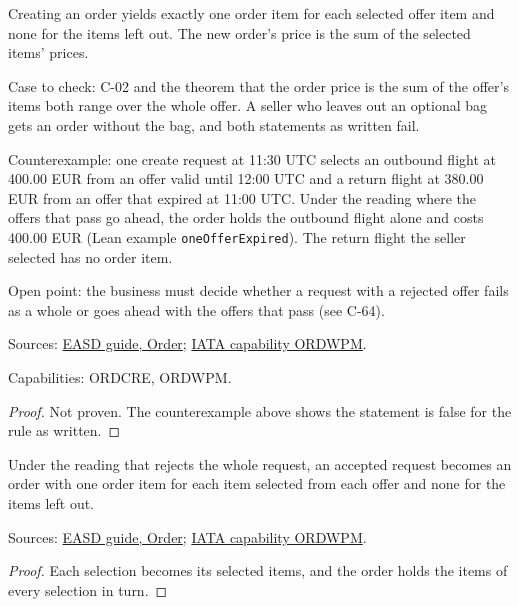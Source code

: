 \begin{theorem}
  \label{thm:order-creation-items-match-selection}
  Creating an order yields exactly one order item for each selected offer
  item and none for the items left out. The new order's price is the sum of
  the selected items' prices.

  Case to check: C-02 and the theorem that the order price is the sum of the
  offer's items both range over the whole offer. A seller who leaves out an
  optional bag gets an order without the bag, and both statements as written
  fail.

  Counterexample: one create request at 11:30 UTC selects an outbound flight
  at 400.00 EUR from an offer valid until 12:00 UTC and a return flight at
  380.00 EUR from an offer that expired at 11:00 UTC.  Under the reading where
  the offers that pass go ahead, the order holds the outbound flight alone
  and costs 400.00 EUR (Lean example \texttt{oneOfferExpired}).
  The return flight the seller selected has no order item.

  Open point: the business must decide whether a request with a rejected
  offer fails as a whole or goes ahead with the offers that pass (see C-64).

  Sources: \href{https://standards.atlassian.net/wiki/spaces/EASD/pages/574849062/Order}{EASD guide, Order};
  \href{https://retailing.iata.org/armi/docs/ORDWPM/}{IATA capability ORDWPM}.

  Capabilities: ORDCRE, ORDWPM.
\end{theorem}
\begin{proof}
  Not proven.  The counterexample above shows the statement is false for the
  rule as written.
\end{proof}

\begin{theorem}
  \label{thm:order-creation-items-match-selection-of-whole}
  Under the reading that rejects the whole request, an accepted request
  becomes an order with one order item for each item selected from each offer
  and none for the items left out.

  Sources: \href{https://standards.atlassian.net/wiki/spaces/EASD/pages/574849062/Order}{EASD guide, Order};
  \href{https://retailing.iata.org/armi/docs/ORDWPM/}{IATA capability ORDWPM}.
\end{theorem}
\begin{proof}
  Each selection becomes its selected items, and the order holds the items of
  every selection in turn.
\end{proof}


